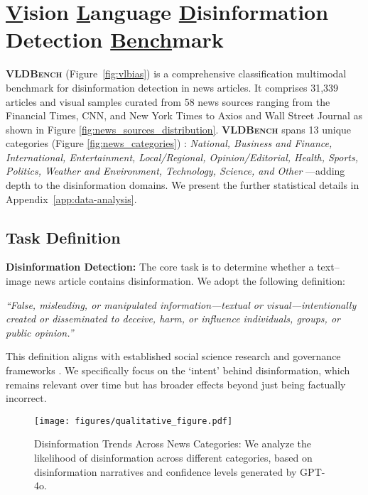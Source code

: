 
\section{\underline{V}ision \underline{L}anguage \underline{D}isinformation Detection \underline{Bench}mark}  
\label{method}  
\textsf{\textbf{\textsc{VLDBench}}} (Figure~\ref{fig:vlbias}) is a comprehensive classification multimodal benchmark for disinformation detection in news articles. It comprises 31,339 articles and visual samples curated from 58 news sources ranging from the Financial Times, CNN, and New York Times to Axios and Wall Street Journal as shown in Figure \ref{fig:news_sources_distribution}. \textsf{\textbf{\textsc{VLDBench}}} spans 13 unique categories (Figure \ref{fig:news_categories}) : \textit{National, Business and Finance, International, Entertainment, Local/Regional, Opinion/Editorial, Health, Sports, Politics, Weather and Environment, Technology, Science, and Other} —adding depth to the disinformation domains. We present the further statistical details in Appendix \ref{app:data-analysis}.
 
\subsection{Task Definition}
\textbf{Disinformation Detection:}  
The core task is to determine whether a text–image news article contains disinformation. We adopt the following definition:  

\emph{“False, misleading, or manipulated information—textual or visual—intentionally created or disseminated to deceive, harm, or influence individuals, groups, or public opinion.”}  

This definition aligns with established social science research \cite{benkler2018network} and governance frameworks \cite{unesco2023journalism}. We specifically focus on the `intent' behind disinformation, which remains relevant over time but has broader effects beyond just being factually incorrect.
\begin{figure*}
    \centering
    \texttt{[image: figures/qualitative\_figure.pdf]}
    \vspace{-1em}
\caption{Disinformation Trends Across News Categories: We analyze the likelihood of disinformation across different categories, based on disinformation narratives and confidence levels generated by GPT-4o.}
    \vspace{-1em}
    \label{fig:disinfo-analysis}
\end{figure*}

